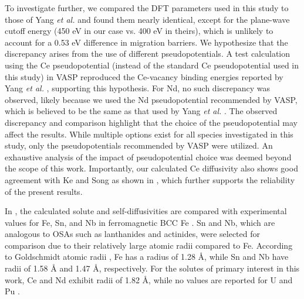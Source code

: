 \documentclass[preprint,12pt]{elsarticle}
\providecommand{\DIFdelbegin}{\protect\color{red}} %
\providecommand{\DIFdelend}{\protect\color{black}} %
\newcommand{\DIFscaledelfig}{0.5}
\newlength{\DIFdelgraphicswidth} %
\newlength{\DIFdelgraphicsheight} %
\newcommand{\DIFdelincludegraphics}[2][]{%
\sbox{\DIFdelgraphicsbox}{\DIFOincludegraphics[#1]{#2}}%
\settoboxwidth{\DIFdelgraphicswidth}{\DIFdelgraphicsbox} %
\settoboxtotalheight{\DIFdelgraphicsheight}{\DIFdelgraphicsbox} %
\scalebox{\DIFscaledelfig}{%
\parbox[b]{\DIFdelgraphicswidth}{\usebox{\DIFdelgraphicsbox}\\[-\baselineskip] \rule{\DIFdelgraphicswidth}{0em}}\llap{\resizebox{\DIFdelgraphicswidth}{\DIFdelgraphicsheight}{%
\setlength{\unitlength}{\DIFdelgraphicswidth}%
\begin{picture}(1,1)%
\thicklines\linethickness{2pt} %
{\color[rgb]{1,0,0}\put(0,0){\framebox(1,1){}}}%
{\color[rgb]{1,0,0}\put(0,0){\line( 1,1){1}}}%
{\color[rgb]{1,0,0}\put(0,1){\line(1,-1){1}}}%
\end{picture}%
}\hspace*{3pt}}} %
} %
\DeclareRobustCommand{\DIFdelbegin}{\DIFOdelbegin \let\includegraphics\DIFdelincludegraphics} %
\DeclareRobustCommand{\DIFdelend}{\DIFOaddend \let\includegraphics\DIFOincludegraphics} %
\begin{document}
To investigate further, we compared the DFT parameters used in this study to those of Yang \textit{et al.} \cite{yang_significant_2023} and found them nearly identical, except for the plane-wave cutoff energy (450 eV in our case vs. 400 eV in theirs), which is unlikely to account for a 0.53 eV difference in migration barriers. We hypothesize that the discrepancy arises from the use of different pseudopotentials. A test calculation using the Ce pseudopotential (instead of the standard Ce pseudopotential used in this study) in VASP reproduced the Ce-vacancy binding energies reported by Yang \textit{et al.} \cite{yang_significant_2023}, supporting this hypothesis. For Nd, no such discrepancy was observed, likely because we used the Nd pseudopotential recommended by VASP, which is believed to be the same as that used by Yang \textit{et al.} \cite{yang_significant_2023}. The observed discrepancy and comparison highlight that the choice of the pseudopotential may affect the results. While multiple options exist for all species investigated in this study, only the pseudopotentials recommended by VASP were utilized. An exhaustive analysis of the impact of pseudopotential choice was deemed beyond the scope of this work.
Importantly, our calculated Ce diffusivity also shows good agreement with Ke and Song \cite{ke2025diffusion} as shown in , which further supports the reliability of the present results.

\DIFdelbegin %

\DIFdelend In , the calculated solute and self-diffusivities are compared with experimental values for Fe, Sn, and Nb in ferromagnetic BCC Fe \cite{lubbehusen1990self, hettich1977self, torres2000diffusion, herzig2002niobium}. Sn and Nb, which are analogous to OSAs such as lanthanides and actinides, were selected for comparison due to their relatively large atomic radii compared to Fe. According to Goldschmidt atomic radii \cite{brandes2013smithells}, Fe has a radius of 1.28 Å, while Sn and Nb have radii of 1.58 Å and 1.47 Å, respectively. For the solutes of primary interest in this work, Ce and Nd exhibit radii of 1.82 Å, while no values are reported for U and Pu \cite{brandes2013smithells}.
\end{document}
